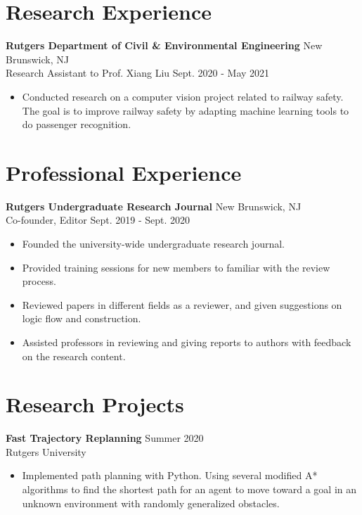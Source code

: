 \documentclass{article}
\begin{document}
\section{Research Experience}
\textbf{Rutgers Department of Civil \& Environmental Engineering}
\hfill{New Brunswick, NJ}\\
Research Assistant to Prof. Xiang Liu
\hfill{Sept. 2020 - May 2021}
\begin{itemize}
  \itemsep0em
  \item Conducted research on a computer vision project related to railway safety.  The goal is to improve railway safety by adapting machine learning tools to do passenger recognition. 
  
\end{itemize}



\section{Professional Experience}
\textbf{Rutgers Undergraduate Research Journal}
\hfill{New Brunswick, NJ}\\
Co-founder, Editor
\hfill{Sept. 2019 - Sept. 2020}
\begin{itemize}
  \itemsep0em
  \item Founded the university-wide undergraduate research journal.
  \item Provided training sessions for new members to familiar with the review process.
  \item Reviewed papers in different fields as a reviewer, and given suggestions on logic flow and construction.
  \item Assisted professors in reviewing and giving reports to authors with feedback on the research content.
\end{itemize}


\section{Research Projects}
\textbf{Fast Trajectory Replanning}
\hfill{Summer 2020}\\
Rutgers University
\begin{itemize}
  \itemsep0em
  \item Implemented path planning with Python. Using several modified A* algorithms to find the shortest path for an agent to move toward a goal in an unknown environment with randomly generalized obstacles.
\end{itemize}
\end{document}
